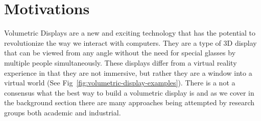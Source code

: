 \section{Motivations}

Volumetric Displays are a new and exciting technology that has the potential to revolutionize the way we interact with computers. They are a type of 3D display that can be viewed from any angle without the need for special glasses by multiple people simultaneously. \cite{1492264} These displays differ from a virtual reality experience in that they are not immersive, but rather they are a window into a virtual world (See Fig~\ref{fig:volumetric-display-examples}). There is a not a consensus what the best way to build a volumetric display is and as we cover in the background section there are many approaches being attempted by research groups both academic and industrial.

